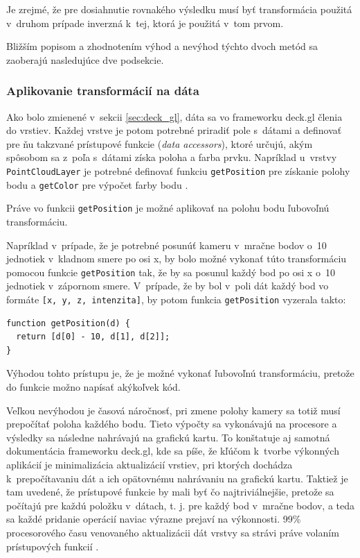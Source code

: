 Je zrejmé, že pre dosiahnutie rovnakého výsledku musí byť transformácia použitá v~druhom prípade inverzná k~tej, ktorá je použitá v~tom prvom.

Bližším popisom a zhodnotením výhod a nevýhod týchto dvoch metód sa zaoberajú nasledujúce dve podsekcie.

\subsubsection{Aplikovanie transformácií na dáta}

Ako bolo zmienené v~sekcii \ref{sec:deck_gl}, dáta sa vo frameworku deck.gl členia do vrstiev. Každej vrstve je potom potrebné priradiť pole s~dátami a definovať pre ňu takzvané prístupové funkcie (\emph{data accessors}), ktoré určujú, akým spôsobom sa z~poľa s~dátami získa poloha a farba prvku. Napríklad u~vrstvy \texttt{PointCloudLayer} je potrebné definovať funkciu \texttt{getPosition} pre získanie polohy bodu a \texttt{getColor} pre výpočet farby bodu \cite{deck.gl_documentation}.

Práve vo funkcii \texttt{getPosition} je možné aplikovať na polohu bodu ľubovoľnú transformáciu.

Napríklad v~prípade, že je potrebné posunúť kameru v~mračne bodov o~10 jednotiek v~kladnom smere po osi x, by bolo možné vykonať túto transformáciu pomocou funkcie \texttt{getPosition} tak, že by sa posunul každý bod po osi x o~10 jednotiek v~zápornom smere. V~prípade, že by bol v~poli dát každý bod vo formáte \texttt{[x, y, z, intenzita]}, by potom funkcia \texttt{getPosition} vyzerala takto:

\begin{lstlisting}
function getPosition(d) {
  return [d[0] - 10, d[1], d[2]];
}
\end{lstlisting}

Výhodou tohto prístupu je, že je možné vykonať ľubovoľnú transformáciu, pretože do funkcie možno napísať akýkoľvek kód.

Veľkou nevýhodou je časová náročnosť, pri zmene polohy kamery sa totiž musí prepočítať poloha každého bodu. Tieto výpočty sa vykonávajú na procesore a výsledky sa následne nahrávajú na grafickú kartu. To konštatuje aj samotná dokumentácia frameworku deck.gl, kde sa píše, že kľúčom k~tvorbe výkonných aplikácií je minimalizácia aktualizácií vrstiev, pri ktorých dochádza k~prepočítavaniu dát a ich opätovnému nahrávaniu na grafickú kartu. Taktiež je tam uvedené, že prístupové funkcie by mali byť čo najtriviálnejšie, pretože sa počítajú pre každú položku v~dátach, t. j. pre každý bod v~mračne bodov, a teda sa každé pridanie operácií naviac výrazne prejaví na výkonnosti. 99\% procesorového času venovaného aktualizácii dát vrstvy sa strávi práve volaním prístupových funkcií \cite{deck.gl_performance_optimization}.

